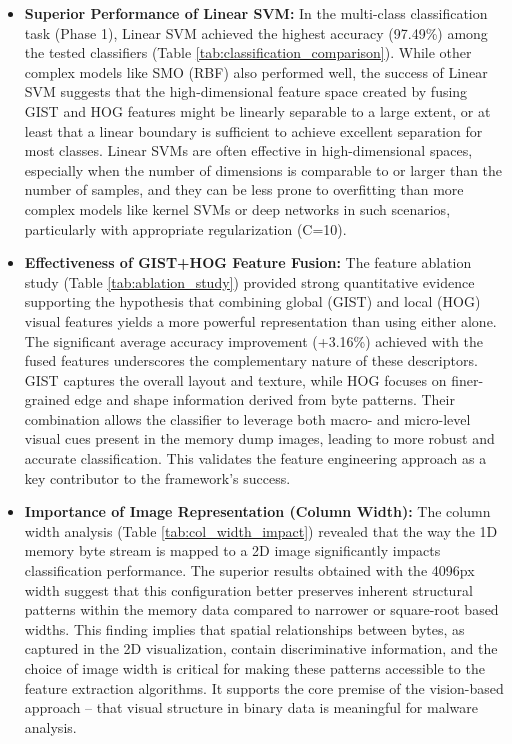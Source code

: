\begin{itemize}
    \item \textbf{Superior Performance of Linear SVM:} In the multi-class classification task (Phase 1), Linear SVM achieved the highest accuracy (97.49\%) among the tested classifiers (Table \ref{tab:classification_comparison}). While other complex models like SMO (RBF) also performed well, the success of Linear SVM suggests that the high-dimensional feature space created by fusing GIST and HOG features might be linearly separable to a large extent, or at least that a linear boundary is sufficient to achieve excellent separation for most classes. Linear SVMs are often effective in high-dimensional spaces, especially when the number of dimensions is comparable to or larger than the number of samples, and they can be less prone to overfitting than more complex models like kernel SVMs or deep networks in such scenarios, particularly with appropriate regularization (C=10).

    \item \textbf{Effectiveness of GIST+HOG Feature Fusion:} The feature ablation study (Table \ref{tab:ablation_study}) provided strong quantitative evidence supporting the hypothesis that combining global (GIST) and local (HOG) visual features yields a more powerful representation than using either alone. The significant average accuracy improvement (+3.16\%) achieved with the fused features underscores the complementary nature of these descriptors. GIST captures the overall layout and texture, while HOG focuses on finer-grained edge and shape information derived from byte patterns. Their combination allows the classifier to leverage both macro- and micro-level visual cues present in the memory dump images, leading to more robust and accurate classification. This validates the feature engineering approach as a key contributor to the framework's success.

    \item \textbf{Importance of Image Representation (Column Width):} The column width analysis (Table \ref{tab:col_width_impact}) revealed that the way the 1D memory byte stream is mapped to a 2D image significantly impacts classification performance. The superior results obtained with the 4096px width suggest that this configuration better preserves inherent structural patterns within the memory data compared to narrower or square-root based widths. This finding implies that spatial relationships between bytes, as captured in the 2D visualization, contain discriminative information, and the choice of image width is critical for making these patterns accessible to the feature extraction algorithms. It supports the core premise of the vision-based approach – that visual structure in binary data is meaningful for malware analysis.


\end{itemize}
